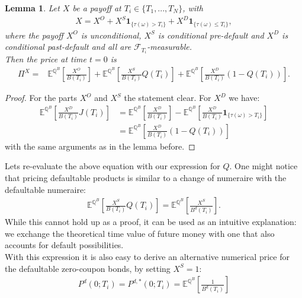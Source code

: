 \documentclass[12pt]{article}
\newtheorem{lemma}[theorem]{Lemma}
\begin{document}
	\begin{lemma}
		Let $X$ be a payoff at $T_i \in \{T_1, ..., T_N\}$, with
		\begin{align*}
			X = X^O + X^S \mathbf{1}_{\{\tau(\omega) > T_i\}} + X^D \mathbf{1}_{\{\tau(\omega) \le T_i\}},
		\end{align*}
		where the payoff $X^O$ is unconditional, $X^S$ is conditional pre-default and $X^D$ is conditional past-default and all are  $\mathcal{F}_{T_i}$-measurable.\\
		Then the price at time $t=0$ is
		\begin{align*}
			\Pi^X =& \mathbb{E}^{\mathbb{Q}^B}\left[ \frac{X^O}{B(T_i)} \right]
			+\mathbb{E}^{\mathbb{Q}^B}\left[ \frac{X^S}{B(T_i)} Q(T_i) \right] + \mathbb{E}^{\mathbb{Q}^B}\left[ \frac{X^D}{B(T_i)} \left(1 - Q(T_i)\right) \right].
		\end{align*}
	\end{lemma}
	\begin{proof}
		For the parts $X^O$ and $X^S$ the statement clear. For $X^D$ we have:
		\begin{align*}
			\mathbb{E}^{\mathbb{Q}^B}\left[ \frac{X^D}{B(T_i)} J(T_i) \right]
			&= \mathbb{E}^{\mathbb{Q}^B}\left[ \frac{X^D}{B(T_i)}\right] - \mathbb{E}^{\mathbb{Q}^B}\left[ \frac{X^D}{B(T_i)} \mathbf{1}_{\{\tau(\omega) > T_i\}} \right]\\
			&=\mathbb{E}^{\mathbb{Q}^B}\left[ \frac{X^D}{B(T_i)} \left(1 - Q(T_i)\right) \right]
		\end{align*}
		with the same arguments as in the lemma before.
	\end{proof}
	Lets re-evaluate the above equation with our expression for $Q$. One might notice that pricing defaultable products is similar to a change of numeraire with the defaultable numeraire: 
	\begin{align}\label{eq:defaultableclaimvaluation}
		\mathbb{E}^{\mathbb{Q}^B}\left[ \frac{X^S}{B(T_i)} Q(T_i) \right] =
		\mathbb{E}^{\mathbb{Q}^B}\left[ \frac{X^S}{B^d(T_i)} \right].
	\end{align}
	While this cannot hold up as a proof, it can be used as an intuitive explanation: we exchange the theoretical time value of future money with one that also accounts for default possibilities.\\
	With this expression it is also easy to derive an alternative numerical price for the defaultable zero-coupon bonds, by setting $X^S=1$:
	\begin{align*}
		P^d(0;T_i) = P^{d,*}(0;T_i) = \mathbb{E}^{\mathbb{Q}^B}\left[ \frac{1}{B^d(T_i)} \right]
	\end{align*}
\end{document}
